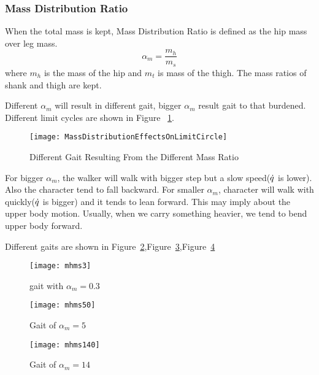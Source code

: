 \subsubsection*{Mass Distribution Ratio}
When the total mass is kept,
Mass Distribution Ratio is defined as the hip mass over leg mass. 
\[
\alpha_m=\frac{m_h}{m_s}
\]
where $m_h$ is the mass of the hip and $m_t$ is mass of the thigh.
The mass ratios of shank and thigh are kept.

Different $\alpha_m$ will result in different gait, bigger $\alpha_m$ result gait to that burdened.
Different limit cycles are shown in Figure ~\ref{fig:differentmh}.
\begin{figure}[!htbp]
  \begin{center}
     \texttt{[image: MassDistributionEffectsOnLimitCircle]}
    \caption{Different Gait Resulting From the Different Mass Ratio}
    \label{fig:differentmh}
\end{center}
\end{figure}

For bigger $\alpha_m$, the walker will walk with bigger step but a slow speed($\dot{q}$ is lower).
Also the character tend to fall backward.
For smaller $\alpha_m$, character will walk with quickly($\dot{q}$ is bigger) and it tends to lean forward.
This may imply about the upper body motion.
Usually, when we carry something heavier, we  tend to bend upper body forward.

Different gaits are shown in Figure~\ref{fig:massh1},Figure~\ref{fig:massh2},Figure~\ref{fig:massh3}
\begin{figure}[!htbp]
  \begin{center}
      \texttt{[image: mhms3]}
    \caption{gait with $\alpha_m=0.3$}
    \label{fig:massh1}
\end{center}
\end{figure}

\begin{figure}[!htbp]
  \begin{center}
      \texttt{[image: mhms50]}
    \caption{Gait of $\alpha_m=5$}
    \label{fig:massh2}
\end{center}
\end{figure}

\begin{figure}[!htbp]
  \begin{center}
      \texttt{[image: mhms140]}
    \caption{Gait of $\alpha_m=14$}
    \label{fig:massh3}
\end{center}
\end{figure}



